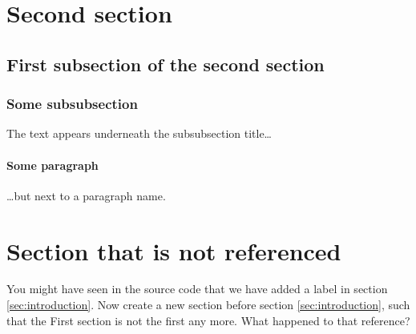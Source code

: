 \documentclass{article}
\begin{document}
	\section[Second section]{Second section}
		\subsection{First subsection of the second section}
		\subsubsection{Some subsubsection}
		
		The text appears underneath the subsubsection title\dots
		\paragraph{Some paragraph} \dots but next to a paragraph name.
		
		
		
	\section*{Section that is not referenced}
	
	You might have seen in the source code that we have added a label in section	\ref{sec:introduction}. Now create a new section before section \ref{sec:introduction}, such that the First section is not the first any more. What happened to that reference? 
	
	

	
	
	
\end{document}
